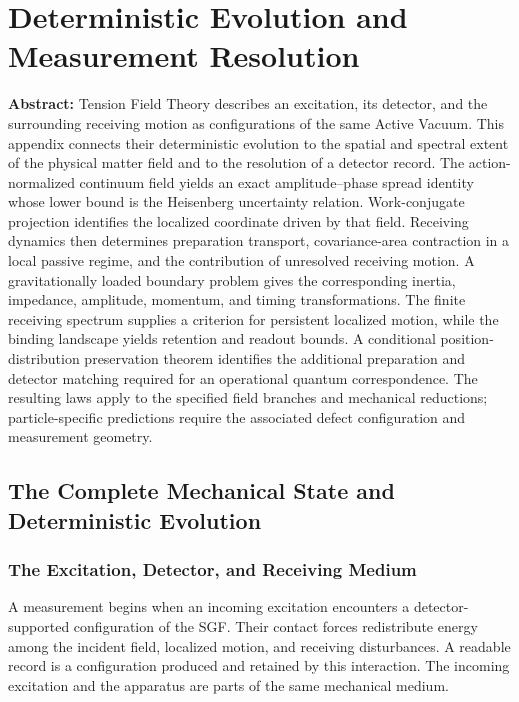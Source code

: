 \chapter[Deterministic Evolution and Measurement Resolution]
{Deterministic Evolution and Measurement Resolution}
\label{app:deterministic_measurement_resolution}

\medskip

\noindent\textbf{Abstract:}
Tension Field Theory describes an excitation, its detector, and the surrounding receiving motion as configurations of the same Active Vacuum. This appendix connects their deterministic evolution to the spatial and spectral extent of the physical matter field and to the resolution of a detector record. The action-normalized continuum field yields an exact amplitude--phase spread identity whose lower bound is the Heisenberg uncertainty relation. Work-conjugate projection identifies the localized coordinate driven by that field. Receiving dynamics then determines preparation transport, covariance-area contraction in a local passive regime, and the contribution of unresolved receiving motion. A gravitationally loaded boundary problem gives the corresponding inertia, impedance, amplitude, momentum, and timing transformations. The finite receiving spectrum supplies a criterion for persistent localized motion, while the binding landscape yields retention and readout bounds. A conditional position-distribution preservation theorem identifies the additional preparation and detector matching required for an operational quantum correspondence. The resulting laws apply to the specified field branches and mechanical reductions; particle-specific predictions require the associated defect configuration and measurement geometry.

\section{The Complete Mechanical State and Deterministic Evolution}
\label{sec:DMR_deterministic_evolution}

\subsection{The Excitation, Detector, and Receiving Medium}

A measurement begins when an incoming excitation encounters a detector-supported configuration of the SGF. Their contact forces redistribute energy among the incident field, localized motion, and receiving disturbances. A readable record is a configuration produced and retained by this interaction. The incoming excitation and the apparatus are parts of the same mechanical medium.

